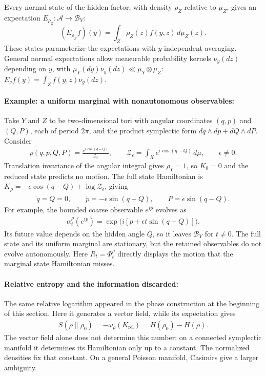 \documentclass[a4paper,11pt]{article}
\theoremstyle{definition}
\newcommand{\mA}{\mathcal{A}}
\newcommand{\mB}{\mathcal{B}}
\begin{document}
Every normal state of the hidden factor, with density $\rho_Z$ relative to $\mu_Z$,
gives an expectation $E_{\rho_Z}:\mA\to\mB_Y$:
\begin{equation}
 (E_{\rho_Z}f)(y)=\int_Z\rho_Z(z)f(y,z)\,d\mu_Z(z).
\end{equation}
These states parameterize the expectations with $y$-independent averaging.
General normal expectations allow measurable probability kernels $\nu_y(dz)$
depending on $y$, with $\mu_Y(dy)\nu_y(dz)\ll\mu_Y\otimes\mu_Z$:
$E_\nu f(y)=\int_Z f(y,z)\nu_y(dz)$.

\paragraph{Example: a uniform marginal with nonautonomous observables:}
Take $Y$ and $Z$ to be two-dimensional tori with angular coordinates $(q,p)$ and $(Q,P)$, each of period $2\pi$, and the product symplectic form $dq\wedge dp+dQ\wedge dP$. Consider
\begin{align}
    \rho(q,p,Q,P)=\frac{e^{\epsilon\cos(q-Q)}}{\mathcal Z_\epsilon},
    \qquad
    \mathcal Z_\epsilon=\int_X e^{\epsilon\cos(q-Q)}\,d\mu,
    \qquad \epsilon\ne0.
\end{align}
Translation invariance of the angular integral gives $\rho_Y=1$, so $K_0=0$ and the reduced state predicts no motion. The full state Hamiltonian is $K_\rho=-\epsilon\cos(q-Q)+\log\mathcal Z_\epsilon$, giving
\begin{align}
    \dot q=\dot Q=0,\qquad
    \dot p=-\epsilon\sin(q-Q),\qquad
    \dot P=\epsilon\sin(q-Q).
\end{align}
For example, the bounded coarse observable $e^{ip}$ evolves as
\begin{align}
    \alpha_t^\rho(e^{ip})
    =\exp\bigl(i[p+\epsilon t\sin(q-Q)]\bigr).
\end{align}
Its future value depends on the hidden angle $Q$, so it leaves $\mB_Y$ for $t\ne0$. The full state and its uniform marginal are stationary, but the retained observables do not evolve autonomously. Here $R_t=\Phi_t^\rho$ directly displays the motion that the marginal state Hamiltonian misses.

\paragraph{Relative entropy and the information discarded:}
The same relative logarithm appeared in the phase construction at the beginning of this section. Here it generates a vector field, while its expectation gives
\begin{align}\label{eq:classical-relative-entropy-Hamiltonian}
    S(\rho\|\rho_0)=-\omega_\rho(K_{\mathrm{rel}})
    =H(\rho_0)-H(\rho).
\end{align}
The vector field alone does not determine this number: on a connected symplectic manifold it determines its Hamiltonian only up to a constant. The normalized densities fix that constant. On a general Poisson manifold, Casimirs give a larger ambiguity.
\end{document}
